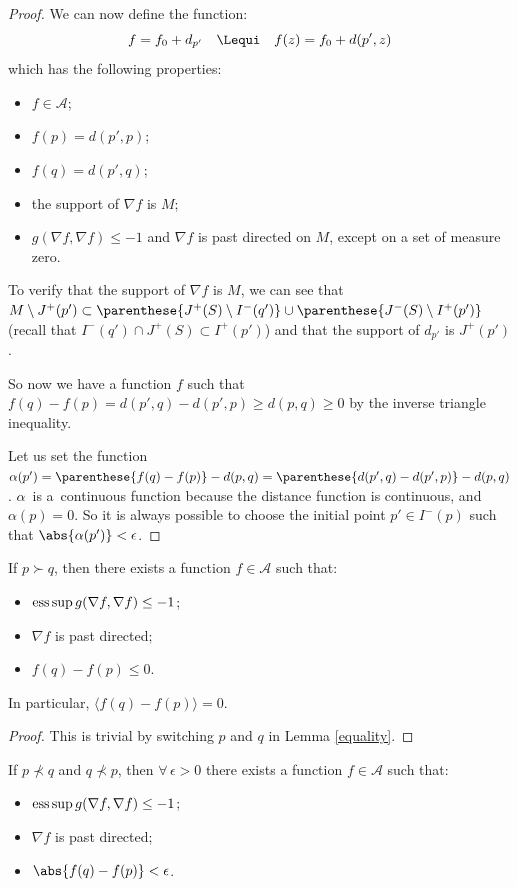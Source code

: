 \begin{proof}
We can now def\/ine the function:
\[
f = f_0 + d_{p'}  \quad \Lequi \quad f(z) = f_0 + d(p',z)
\]
which has the following properties:
\begin{itemize}\itemsep=0pt
\item $f\in\mathcal A$;
\item $f(p)= d(p',p)$;
\item $f(q)= d(p',q)$;
\item the support of $\nabla f$ is $M$;
\item $g( \nabla f, \nabla f) \leq -1$ and $\nabla f$ is past directed on $M$, except on a set of measure zero.
\end{itemize}

To verify that the support of $\nabla f$ is $M$, we can see that $M \setminus J^+(p') \subset \parenthese{J^+(S) \setminus I^-(q')} \cup  \parenthese{J^-(S) \setminus I^+(p')} $ (recall that $I^-(q') \cap J^+(S) \subset I^+(p')$) and that the support of $d_{p'}$ is $J^+(p')$.

So now we have a function $f$ such that $f(q)-f(p) = d(p',q) - d(p',p) \geq d(p,q) \geq 0$ by the inverse triangle inequality.

Let us set the function $\alpha(p') = \parenthese{f(q) - f(p)} - d(p,q) = \parenthese{d(p',q) - d(p',p)} - d(p,q)$. $\alpha$~is a~continuous function because the distance function is continuous, and $\alpha(p) = 0$. So it is always possible to choose the initial point $p' \in I^-(p)$ such that $\abs{\alpha(p')} < \epsilon$.
\end{proof}

\begin{corollary}\label{equalityrev}
If $p \succ q$, then there exists a function $f\in \mathcal A$ such that:
\begin{itemize}\itemsep=0pt
\item $\text{\rm ess} \sup g( \nabla f, \nabla f ) \leq -1$;
\item $\nabla f$ is past directed;
\item $f(q)-f(p) \leq 0$.
\end{itemize}
In particular, $\langle f(q)-f(p) \rangle = 0$.

\end{corollary}

\begin{proof}
This is trivial by switching $p$ and $q$ in Lemma \ref{equality}.
\end{proof}

\begin{lemma}\label{zero}
If $p \nprec q$ and $q \nprec p$, then $\forall \, \epsilon > 0$ there exists a function $f\in \mathcal A$ such that:
\begin{itemize}
\item $\text{\rm ess} \sup g( \nabla f, \nabla f ) \leq -1$;
\item $\nabla f$ is past directed;
\item $\abs{f(q)-f(p)} < \epsilon$.
\end{itemize}
\end{lemma}

